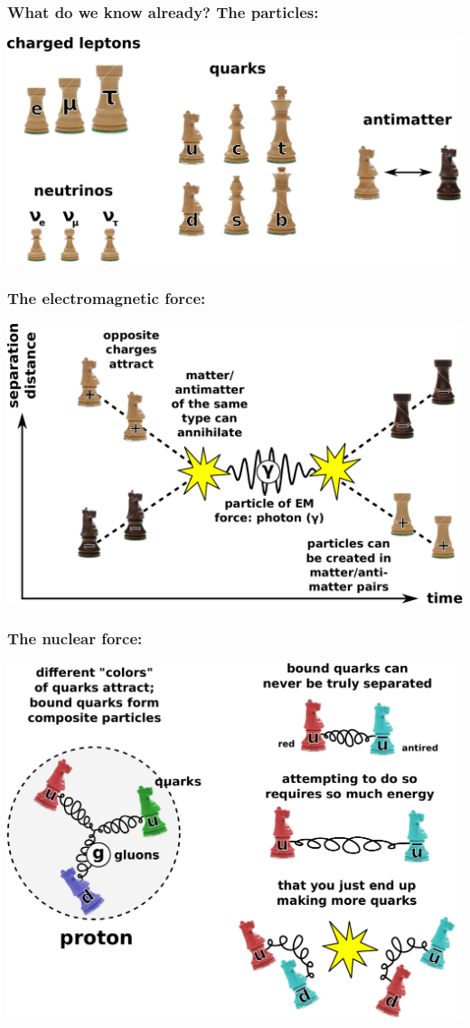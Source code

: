 \documentclass[compress]{beamer}
\begin{document}
\begin{frame}
\frametitle{What do we know already?  The particles:}
\includegraphics[width=\linewidth]{players.pdf}
\end{frame}

\begin{frame}
\frametitle{The electromagnetic force:}
\includegraphics[width=\linewidth]{electromagnetism.pdf}
\end{frame}

\begin{frame}
\frametitle{The nuclear force:}
\begin{center}
\includegraphics[width=0.95\linewidth]{nuclear.pdf}
\end{center}
\end{frame}
\end{document}
